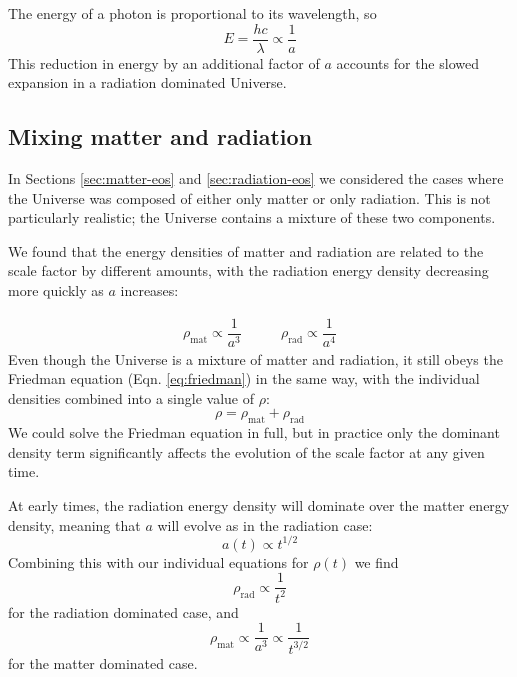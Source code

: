 \documentclass[11pt,a4paper,notoc]{tufte-handout}
\begin{document}
The energy of a photon is proportional to its wavelength, so
\begin{equation}
E = \dfrac{h c}{\lambda} \propto \dfrac{1}{a}
\label{eq:lambda-a-3}
\end{equation}
This reduction in
energy by an additional factor of \(a\) accounts for the slowed expansion
in a radiation dominated Universe.

\hypertarget{sec:mixtures}{%
\subsection{Mixing matter and radiation}\label{sec:mixtures}}

In Sections \ref{sec:matter-eos} and
\ref{sec:radiation-eos} we considered the cases where the
Universe was composed of either only matter or only radiation. This is
not particularly realistic; the Universe contains a mixture of these two
components.

We found that the energy densities of matter and radiation are related
to the scale factor by different amounts, with the radiation energy
density decreasing more quickly as \(a\) increases:

\begin{equation}
\begin{array}{lr}
    \rho_{\text{mat}} \propto \dfrac{1}{a^3} & \qquad
    \rho_{\text{rad}} \propto \dfrac{1}{a^4}
\end{array}
\label{eq:rad-mat-1}
\end{equation}
Even though the Universe is a mixture of matter and
radiation, it still obeys the Friedman equation
(Eqn. \eqref{eq:friedman}) in the same way, with the individual
densities combined into a single value of \(\rho\):
\begin{equation}
\rho = \rho_{\text{mat}} + \rho_{\text{rad}}
\label{eq:rho-mat-rad}
\end{equation}
We could solve the
Friedman equation in full, but in practice only the dominant density term significantly affects the evolution of the scale factor at any
given time.

At early times, the radiation energy density will dominate over the
matter energy density, meaning that \(a\) will evolve as in the radiation
case:
\begin{equation}
a(t) \propto t^{1/2}
\label{eq:a-t}
\end{equation}
Combining this with our individual
equations for \(\rho(t)\) we find
\begin{equation}
\rho_{\text{rad}} \propto \dfrac{1}{t^2}
\label{eq:rho-rad-t}
\end{equation}
for the radiation dominated case, and
\begin{equation}
     \rho_{\text{mat}} \propto \dfrac{1}{a^3} \propto \dfrac{1}{t^{3/2}}
\label{eq:rho-mat-t}
\end{equation}
for the matter dominated case.
\end{document}
